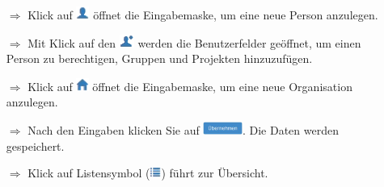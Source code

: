 \documentclass{article}
\begin{document}
\begin{multicols}{2}

\begin{tcolorbox}[colback=blue!5,colframe=blue!40!black,title=Personen und Organisationen anlegen]
\begin{itemize}
  \item[$\Longrightarrow$] Klick auf \includegraphics[height=12pt]{Icons/Person.png} öffnet die Eingabemaske, um eine neue Person anzulegen.
	\item[$\Longrightarrow$] Mit Klick auf den \includegraphics[height=12pt]{Icons/User.png} werden die Benutzerfelder geöffnet, um einen Person zu berechtigen, Gruppen und Projekten hinzuzufügen.
  \item[$\Longrightarrow$] Klick auf \includegraphics[height=12pt]{Icons/Haus.png} öffnet die Eingabemaske, um eine neue Organisation anzulegen.
  \item[$\Longrightarrow$] Nach den Eingaben klicken Sie auf \includegraphics[height=12pt]{Icons/B_Uebernehmen.jpg}. Die Daten werden gespeichert.
  \item[$\Longrightarrow$] Klick auf Listensymbol (\includegraphics[height=10pt]{Icons/Listensymbol_zurueck.png}) führt zur Übersicht.

\end{itemize}
\end{tcolorbox}


\end{multicols}
\end{document}

